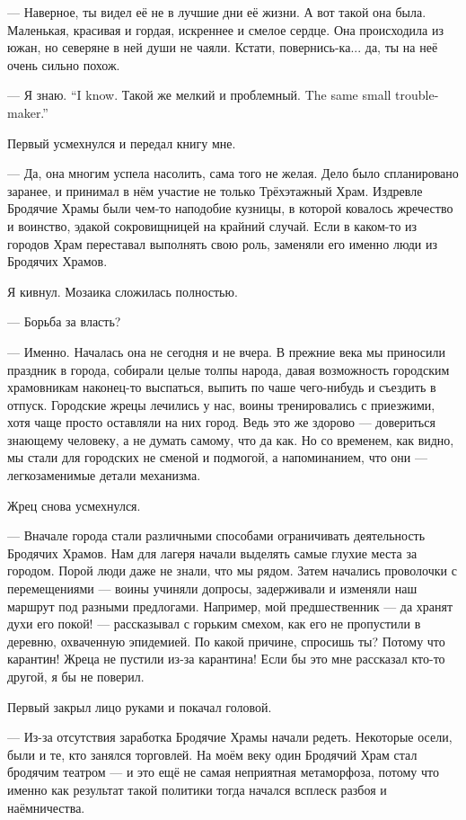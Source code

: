 --- Наверное, ты видел её не в лучшие дни её жизни.
А вот такой она была.
Маленькая, красивая и гордая, искреннее и смелое сердце.
Она происходила из южан, но северяне в ней души не чаяли.
Кстати, повернись-ка...
да, ты на неё очень сильно похож.

{--- Я знаю.}
{``I know.}
{Такой же мелкий и проблемный.}
{The same small trouble-maker.''}

Первый усмехнулся и передал книгу мне.

--- Да, она многим успела насолить, сама того не желая.
Дело было спланировано заранее, и принимал в нём участие не только Трёхэтажный Храм.
Издревле Бродячие Храмы были чем-то наподобие кузницы, в которой ковалось жречество и воинство, эдакой сокровищницей на крайний случай.
Если в каком-то из городов Храм переставал выполнять свою роль, заменяли его именно люди из Бродячих Храмов.

Я кивнул.
Мозаика сложилась полностью.

--- Борьба за власть?

--- Именно.
Началась она не сегодня и не вчера.
В прежние века мы приносили праздник в города, собирали целые толпы народа, давая возможность городским храмовникам наконец-то выспаться, выпить по чаше чего-нибудь и съездить в отпуск.
Городские жрецы лечились у нас, воины тренировались с приезжими, хотя чаще просто оставляли на них город.
Ведь это же здорово --- довериться знающему человеку, а не думать самому, что да как.
Но со временем, как видно, мы стали для городских не сменой и подмогой, а напоминанием, что они --- легкозаменимые детали механизма.

Жрец снова усмехнулся.

--- Вначале города стали различными способами ограничивать деятельность Бродячих Храмов.
Нам для лагеря начали выделять самые глухие места за городом.
Порой люди даже не знали, что мы рядом.
Затем начались проволочки с перемещениями --- воины учиняли допросы, задерживали и изменяли наш маршрут под разными предлогами.
Например, мой предшественник --- да хранят духи его покой! --- рассказывал с горьким смехом, как его не пропустили в деревню, охваченную эпидемией.
По какой причине, спросишь ты?
Потому что карантин!
Жреца не пустили из-за карантина!
Если бы это мне рассказал кто-то другой, я бы не поверил.

Первый закрыл лицо руками и покачал головой.

--- Из-за отсутствия заработка Бродячие Храмы начали редеть.
Некоторые осели, были и те, кто занялся торговлей.
На моём веку один Бродячий Храм стал бродячим театром --- и это ещё не самая неприятная метаморфоза, потому что именно как результат такой политики тогда начался всплеск разбоя и наёмничества.

